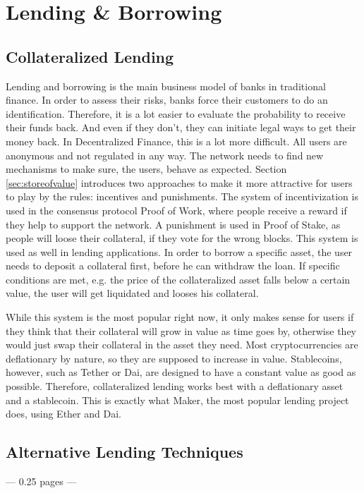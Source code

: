 \section{Lending \& Borrowing}
\subsection{Collateralized Lending}
Lending and borrowing is the main business model of banks in traditional finance. In order to assess their risks, banks force their customers to do an identification. Therefore, it is a lot easier to evaluate the probability to receive their funds back. And even if they don't, they can initiate legal ways to get their money back.
In Decentralized Finance, this is a lot more difficult. All users are anonymous and not regulated in any way. The network needs to find new mechanisms to make sure, the users, behave as expected. Section \ref{sec:storeofvalue} introduces two approaches to make it more attractive for users to play by the rules: incentives and punishments. The system of incentivization is used in the consensus protocol Proof of Work, where people receive a reward if they help to support the network. A punishment is used in Proof of Stake, as people will loose their collateral, if they vote for the wrong blocks. This system is used as well in lending applications. In order to borrow a specific asset, the user needs to deposit a collateral first, before he can withdraw the loan. If specific conditions are met, e.g. the price of the collateralized asset falls below a certain value, the user will get liquidated and looses his collateral.

While this system is the most popular right now, it only makes sense for users if they think that their collateral will grow in value as time goes by, otherwise they would just swap their collateral in the asset they need. Most cryptocurrencies are deflationary by nature, so they are supposed to increase in value. Stablecoins, however, such as Tether or Dai, are designed to have a constant value as good as possible. Therefore, collateralized lending works best with a deflationary asset and a stablecoin. This is exactly what Maker\cite{MakerDAO2021}, the most popular lending project does, using Ether and Dai.

\subsection{Alternative Lending Techniques}
--- 0.25 pages ---

